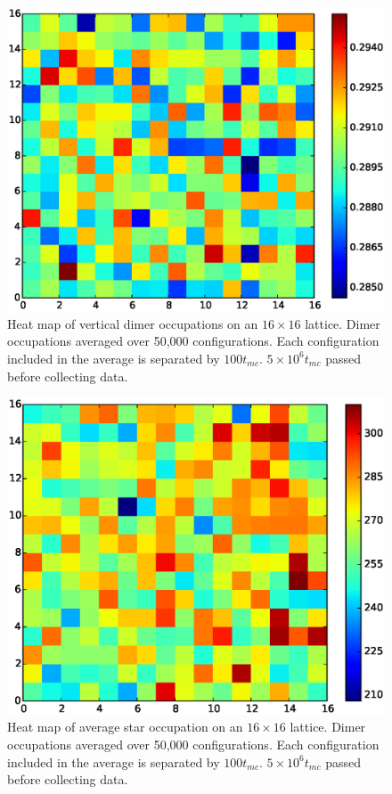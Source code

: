 \documentclass[aps,floatfix,11pt]{revtex4-1}
\begin{document}
\begin{figure}[h]
    \centering
    \includegraphics[width=8.5 cm]{grey_scale_avg_vert_16x16}
    \caption{Heat map of vertical dimer occupations on an $16\times 16$ lattice. Dimer
        occupations averaged over 50,000 configurations. Each
        configuration included in the average is separated by $100t_{mc}$. $5\times 10^6 t_{mc}$ passed
        before collecting data. \label{fig:vert_avg_heat_16x16}}
\end{figure}

\begin{figure}[h]
    \centering
    \includegraphics[width=8.5 cm]{grey_scale_avg_star_16x16}
    \caption{Heat map of average star occupation on an $16\times 16$ lattice. Dimer
        occupations averaged over 50,000 configurations. Each
        configuration included in the average is separated by $100t_{mc}$. $5\times 10^6 t_{mc}$ passed
        before collecting data. \label{fig:star_avg_heat_16x16}}
\end{figure}


\clearpage
\end{document}
